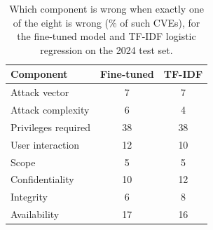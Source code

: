 \begin{table}[t]
\centering
\caption{Which component is wrong when exactly one of the eight is wrong (\% of such CVEs), for the fine-tuned model and TF-IDF logistic regression on the 2024 test set.}
\label{tab:sole}
\small
\begin{tabular}{lcc}
\toprule
Component & Fine-tuned & TF-IDF \\
\midrule
Attack vector & 7 & 7 \\
Attack complexity & 6 & 4 \\
Privileges required & 38 & 38 \\
User interaction & 12 & 10 \\
Scope & 5 & 5 \\
Confidentiality & 10 & 12 \\
Integrity & 6 & 8 \\
Availability & 17 & 16 \\
\bottomrule
\end{tabular}
\end{table}
